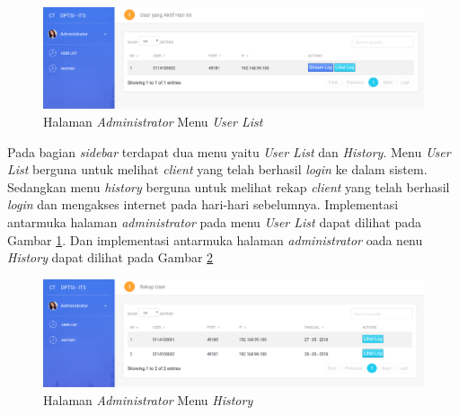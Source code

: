 \begin{figure}[H]
	\centering
	\includegraphics[width=\linewidth]{images/bab4/useraktif}
	\caption{Halaman \textit{Administrator} Menu \textit{User List}}
	\label{halamandashboardadmin}
\end{figure}

Pada bagian \textit{sidebar} terdapat dua menu yaitu \textit{User List} dan \textit{History}. Menu \textit{User List} berguna untuk melihat \textit{client} yang telah berhasil \textit{login} ke dalam sistem. Sedangkan menu \textit{history} berguna untuk melihat rekap \textit{client} yang telah berhasil \textit{login} dan mengakses internet pada hari-hari sebelumnya. Implementasi antarmuka halaman \textit{administrator} pada menu \textit{User List} dapat dilihat pada Gambar \ref{halamandashboardadmin}. Dan implementasi antarmuka halaman \textit{administrator} oada nenu \textit{History} dapat dilihat pada Gambar \ref{userrekap}

\begin{figure}[H]
	\centering
	\includegraphics[width=\linewidth]{images/bab4/userrekap}
	\caption{Halaman \textit{Administrator} Menu \textit{History}}
	\label{userrekap}
\end{figure}